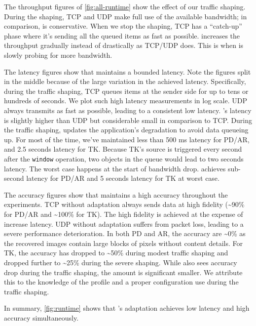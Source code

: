 The throughput figures of \autoref{fig:all-runtime} show the effect of our
traffic shaping. During the shaping, TCP and UDP make full use of the available
bandwidth; in comparison, \sysname{} is conservative. When we stop the shaping,
TCP has a ``catch-up'' phase where it's sending all the queued items as fast as
possible. \sysname{} increases the throughput gradually instead of drastically
as TCP/UDP does. This is when \sysname{} is slowly probing for more bandwidth.

The latency figures show that \sysname{} maintains a bounded latency. Note the
figures split in the middle because of the large variation in the achieved
latency. Specifically, during the traffic shaping, TCP queues items at the
sender side for up to tens or hundreds of seconds. We plot such high latency
measurements in log scale. UDP always transmits as fast as possible, leading to
a consistent low latency. \sysname{}'s latency is slightly higher than UDP but
considerable small in comparison to TCP. During the traffic shaping, \sysname{}
updates the application's degradation to avoid data queueing up. For most of the
time, we've maintained less than 500 ms latency for PD/AR, and 2.5 seconds
latency for TK. Because TK's source is triggered every second after the
\texttt{window} operation, two objects in the queue would lead to two seconds
latency. The worst case happens at the start of bandwidth drop. \sysname{}
achieves sub-second latency for PD/AR and 5 seconds latency for TK at worst
case.

The accuracy figures show that \sysname{} maintains a high accuracy throughout
the experiments. TCP without adaptation always sends data at high fidelity
(\textasciitilde 90\% for PD/AR and \textasciitilde 100\% for TK). The high
fidelity is achieved at the expense of increase latency. UDP without adaptation
suffers from packet loss, leading to a severe performance deterioration.  In
both PD and AR, the accuracy are \textasciitilde 0\% as the recovered images
contain large blocks of pixels without content details. For TK, the accuracy has
dropped to \textasciitilde 50\% during modest traffic shaping and dropped
further to \textasciitilde 25\% during the severe shaping. While \sysname{} also
sees accuracy drop during the traffic shaping, the amount is significant
smaller. We attribute this to the knowledge of the profile and a proper
configuration use during the traffic shaping.

In summary, \autoref{fig:runtime} shows that \sysname{}'s adaptation achieves
low latency and high accuracy simultaneously.

